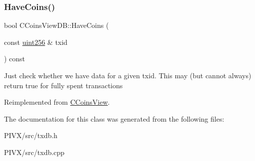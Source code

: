 \subsubsection{\texorpdfstring{Have\+Coins()}{HaveCoins()}}
{\footnotesize\ttfamily bool C\+Coins\+View\+D\+B\+::\+Have\+Coins (\begin{DoxyParamCaption}\item[{const \mbox{\hyperlink{classuint256}{uint256}} \&}]{txid }\end{DoxyParamCaption}) const\hspace{0.3cm}{\ttfamily [virtual]}}

Just check whether we have data for a given txid. This may (but cannot always) return true for fully spent transactions 

Reimplemented from \mbox{\hyperlink{class_c_coins_view_ade3a65fc3f1b02baf7bebce630e4eba3}{C\+Coins\+View}}.



The documentation for this class was generated from the following files\+:\begin{DoxyCompactItemize}
\item 
P\+I\+V\+X/src/txdb.\+h\item 
P\+I\+V\+X/src/txdb.\+cpp\end{DoxyCompactItemize}
